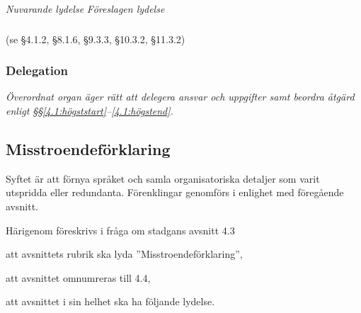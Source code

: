 \documentclass{article}
\newenvironment{lydelse}
    {\begin{paracol}{2}%
        \emph{Nuvarande lydelse}%
        \switchcolumn%
        \emph{Föreslagen lydelse}%
    \end{paracol}%
    \begin{enumerate}[label=\thesubsection.\arabic*]%
    \begin{paracol}{2}%
    }{\end{paracol}\end{enumerate}}
\begin{document}
\begin{lydelse}
  \switchcolumn*
    \subsubsection*{}
    \item[] (se \S 4.1.2, \S 8.1.6, \S 9.3.3, \S 10.3.2, \S 11.3.2)

  \switchcolumn
    \subsubsection*{Delegation} 
    \item \emph{Överordnat organ äger rätt att delegera ansvar och uppgifter samt beordra åtgärd enligt \S\S\ref{4.1:högststart}--\ref{4.1:högstend}.} 
      \label{4.x:delegation}
  
\end{lydelse}

\subsection{Misstroendeförklaring}
Syftet är att förnya språket och samla organisatoriska detaljer som varit utspridda eller redundanta.
Förenklingar genomförs i enlighet med föregående avsnitt.

Härigenom föreskrivs i fråga om stadgans avsnitt 4.3
\begin{dels}
    \item att avsnittets rubrik ska lyda ''Misstroendeförklaring'',
    \item att avsnittet omnumreras till 4.4,
    \item att avsnittet i sin helhet ska ha följande lydelse.
\end{dels}
\end{document}
